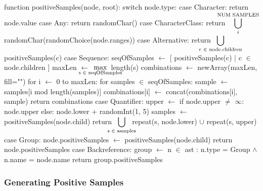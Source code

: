 \begin{pseudoCode}[title={Generating Positive Test Samples},breakable=true,label=code:verificationPositive]
function positiveSamples(node, root):
  switch node.type:
    case Character: %
      return { node.value }
    case Any:
      return { randomChar() } %
    case CharacterClass: %
      return ${\displaystyle \hspace{-1.5em}\bigcup_{i}^\text{NUM SAMPLES}}\hspace{-1.5em}$ randomChar(randomChoice(node.ranges)) %
    case Alternative: %
      return ${\displaystyle \hspace{-2em}\bigcup_{\text{c }\in\text{ node.children}}\hspace{-2em}}$ positiveSamples(c) %
    case Sequence:  %
      seqOfSamples $\gets$ [ positiveSamples(c) $\mid$ c $\in$ node.children ]
      maxLen $\gets$ ${\displaystyle \hspace{-2em}\max_{\text{s } \in \text{ seqOfSamples}}}\hspace{-2em}$  length(s)
      combinations $\gets$ newArray(maxLen, fill="")
      for i $\gets$ 0 to maxLen:
        for samples $\in$ seqOfSamples:
          sample $\gets$ samples[i mod length(samples)]
          combinations[i] $\gets$ concat(combinations[i], sample)
      return combinations %
    case Quantifier: %
      upper $\gets$ if node.upper $\neq$ $\infty$:
                 node.upper 
               else: node.lower + randomInt(1, 5) 
      samples $\gets$ positiveSamples(node.child)
      return ${\displaystyle \hspace{-1em}\bigcup_{\text{s }\in\text{ samples}}\hspace{-1em}}$ repeat(s, node.lower) $\cup$ repeat(s, upper)  %
    case Group: %
        node.positiveSamples $\gets$ positiveSamples(node.child)        
        return node.positiveSamples
    case Backreference:
      group $\gets$ n $\in$ ast : n.type = Group $\land$ n.name = node.name
      return group.positiveSamples %
\end{pseudoCode}

\subsubsection{Generating Positive Samples}

